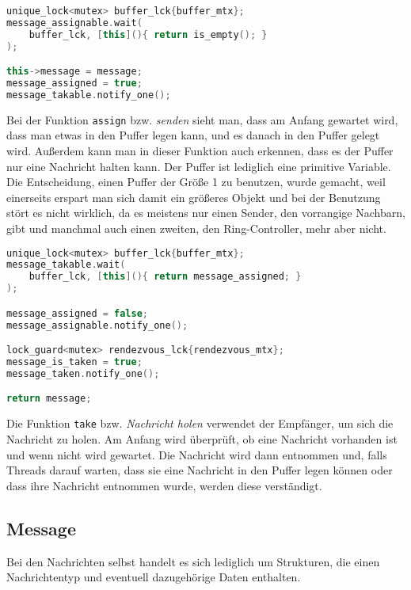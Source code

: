 \noindent\hrulefill\par
\begin{minipage}{\linewidth}
\begin{lstlisting}[language=C++, caption={nur senden, ohne warten}]
unique_lock<mutex> buffer_lck{buffer_mtx};
message_assignable.wait(
    buffer_lck, [this](){ return is_empty(); }
);

this->message = message;
message_assigned = true;
message_takable.notify_one();
\end{lstlisting}
\end{minipage}

Bei der Funktion \verb|assign| bzw. \textit{senden} sieht man, dass am Anfang gewartet wird, dass man etwas in den Puffer legen kann, und es danach
in den Puffer gelegt wird. Außerdem kann man in dieser Funktion auch erkennen, dass es der Puffer nur eine Nachricht halten kann. Der Puffer ist lediglich
eine primitive Variable. Die Entscheidung, einen Puffer der Größe 1 zu benutzen, wurde gemacht, weil einerseits erspart man sich damit ein größeres Objekt
und bei der Benutzung stört es nicht wirklich, da es meistens nur einen Sender, den vorrangige Nachbarn, gibt und manchmal auch einen zweiten, den
Ring-Controller, mehr aber nicht.

\noindent\hrulefill\par
\begin{minipage}{\linewidth}
\begin{lstlisting}[language=C++, caption=Nachricht holen]
unique_lock<mutex> buffer_lck{buffer_mtx};
message_takable.wait(
    buffer_lck, [this](){ return message_assigned; }
);

message_assigned = false;
message_assignable.notify_one();

lock_guard<mutex> rendezvous_lck{rendezvous_mtx};
message_is_taken = true;
message_taken.notify_one();

return message;
\end{lstlisting}
\end{minipage}

Die Funktion \verb|take| bzw. \textit{Nachricht holen} verwendet der Empfänger, um sich die Nachricht zu holen. Am Anfang wird überprüft, ob eine
Nachricht vorhanden ist und wenn nicht wird gewartet. Die Nachricht wird dann entnommen und, falls Threads darauf warten, dass sie eine Nachricht in den
Puffer legen können oder dass ihre Nachricht entnommen wurde, werden diese verständigt.


\subsection{Message}

Bei den Nachrichten selbst handelt es sich lediglich um Strukturen, die einen Nachrichtentyp und eventuell dazugehörige Daten enthalten.

